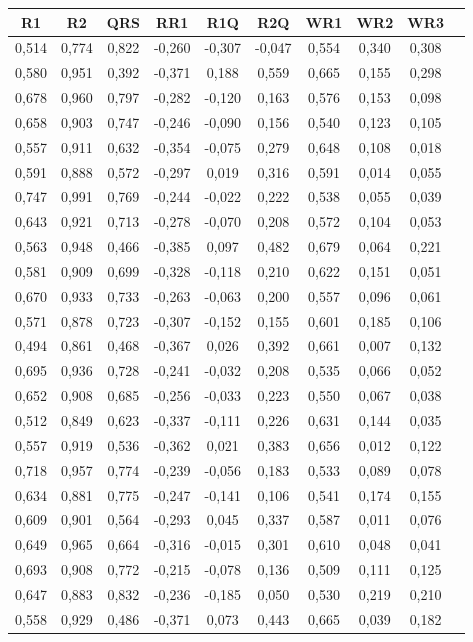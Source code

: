\begin{table}[ht]
\centering
\begin{tabular}{|c|c|c|c|c|c|c|c|c|c|}
\hline
	R1 & R2 & QRS & RR1 & R1Q & R2Q & WR1 & WR2 & WR3\\
\hline
		0,514&0,774&0,822&-0,260&-0,307&-0,047&0,554&0,340&0,308\\
		0,580&0,951&0,392&-0,371&0,188&0,559&0,665&0,155&0,298\\
		0,678&0,960&0,797&-0,282&-0,120&0,163&0,576&0,153&0,098\\
		0,658&0,903&0,747&-0,246&-0,090&0,156&0,540&0,123&0,105\\
		0,557&0,911&0,632&-0,354&-0,075&0,279&0,648&0,108&0,018\\
		0,591&0,888&0,572&-0,297&0,019&0,316&0,591&0,014&0,055\\
		0,747&0,991&0,769&-0,244&-0,022&0,222&0,538&0,055&0,039\\
		0,643&0,921&0,713&-0,278&-0,070&0,208&0,572&0,104&0,053\\
		0,563&0,948&0,466&-0,385&0,097&0,482&0,679&0,064&0,221\\
		0,581&0,909&0,699&-0,328&-0,118&0,210&0,622&0,151&0,051\\
		0,670&0,933&0,733&-0,263&-0,063&0,200&0,557&0,096&0,061\\
		0,571&0,878&0,723&-0,307&-0,152&0,155&0,601&0,185&0,106\\
		0,494&0,861&0,468&-0,367&0,026&0,392&0,661&0,007&0,132\\
		0,695&0,936&0,728&-0,241&-0,032&0,208&0,535&0,066&0,052\\
		0,652&0,908&0,685&-0,256&-0,033&0,223&0,550&0,067&0,038\\
		0,512&0,849&0,623&-0,337&-0,111&0,226&0,631&0,144&0,035\\
		0,557&0,919&0,536&-0,362&0,021&0,383&0,656&0,012&0,122\\
		0,718&0,957&0,774&-0,239&-0,056&0,183&0,533&0,089&0,078\\
		0,634&0,881&0,775&-0,247&-0,141&0,106&0,541&0,174&0,155\\
		0,609&0,901&0,564&-0,293&0,045&0,337&0,587&0,011&0,076\\
		0,649&0,965&0,664&-0,316&-0,015&0,301&0,610&0,048&0,041\\
		0,693&0,908&0,772&-0,215&-0,078&0,136&0,509&0,111&0,125\\
		0,647&0,883&0,832&-0,236&-0,185&0,050&0,530&0,219&0,210\\
		0,558&0,929&0,486&-0,371&0,073&0,443&0,665&0,039&0,182\\

\end{tabular}
\end{table}
